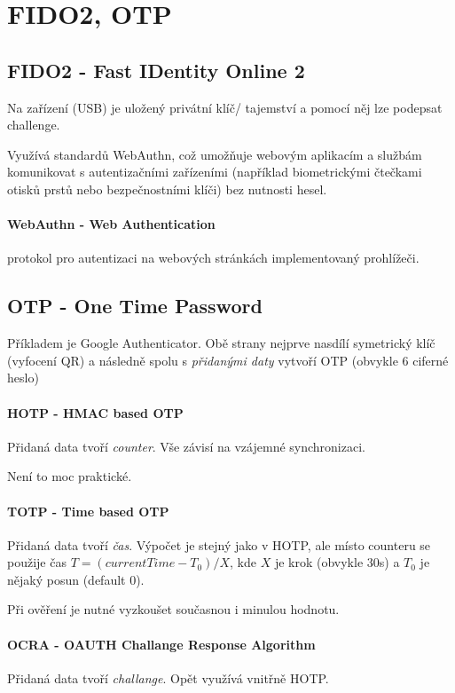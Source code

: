 \documentclass[10pt,a4paper]{article}
\begin{document}
\section{FIDO2, OTP}
\subsection{FIDO2 - Fast IDentity Online 2}
Na zařízení (USB) je uložený privátní klíč/ tajemství a pomocí něj lze podepsat challenge.

Využívá standardů WebAuthn, což umožňuje webovým aplikacím a službám komunikovat s autentizačními zařízeními (například biometrickými čtečkami otisků prstů nebo bezpečnostními klíči) bez nutnosti hesel. 

\paragraph{WebAuthn - Web Authentication} protokol pro autentizaci na webových stránkách implementovaný prohlížeči.

\subsection{OTP - One Time Password}

Příkladem je Google Authenticator. Obě strany nejprve nasdílí symetrický klíč (vyfocení QR) a následně spolu s \textit{přidanými daty} vytvoří OTP (obvykle $ 6 $ ciferné heslo)

\paragraph{HOTP - HMAC based OTP}

Přidaná data tvoří \textit{counter}. Vše závisí na vzájemné synchronizaci.

Není to moc praktické. 

\paragraph{TOTP - Time based OTP}

Přidaná data tvoří \textit{čas}.
Výpočet je stejný jako v HOTP, ale místo counteru se použije čas $ T = (\textit{currentTime} - T_0) / X $, kde $X$ je krok (obvykle $ 30 $s) a $ T_0 $ je nějaký posun (default $ 0 $).

Při ověření je nutné vyzkoušet současnou i minulou hodnotu.

\paragraph{OCRA - OAUTH Challange Response Algorithm}
Přidaná data tvoří \textit{challange}. Opět využívá vnitřně HOTP.
\end{document}
